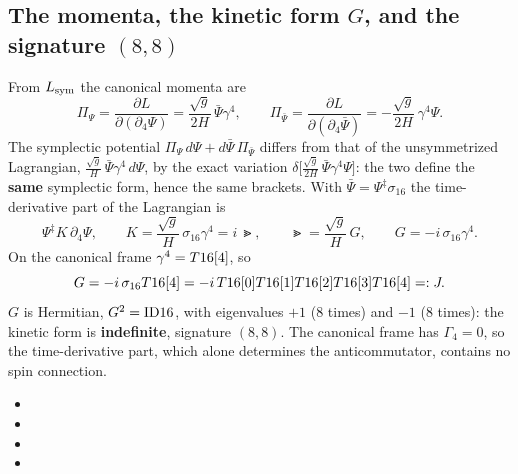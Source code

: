 \subsection{The momenta, the kinetic form \texorpdfstring{$G$}{G}, and the signature \texorpdfstring{$(8,8)$}{(8,8)}}
\label{sec:6.2}

From $L_{\mathrm{sym}}$ the canonical momenta are
\[
  \Pi_\Psi=\frac{\partial L}{\partial(\partial_4\Psi)}=\frac{\sqrt g}{2H}\,\bar\Psi\gamma^4,\qquad
  \Pi_{\bar\Psi}=\frac{\partial L}{\partial(\partial_4\bar\Psi)}=-\frac{\sqrt g}{2H}\,\gamma^4\Psi .
\]
The symplectic potential $\Pi_\Psi\,d\Psi+d\bar\Psi\,\Pi_{\bar\Psi}$ differs from that of the
unsymmetrized Lagrangian, $\frac{\sqrt g}{H}\,\bar\Psi\gamma^4\,d\Psi$, by the exact variation
$\delta\bigl[\frac{\sqrt g}{2H}\,\bar\Psi\gamma^4\Psi\bigr]$: the two define the \textbf{same}
symplectic form, hence the same brackets. With $\bar\Psi=\Psi^{\ddagger}\sigma_{16}$ the
time-derivative part of the Lagrangian is
\[
  \Psi^{\ddagger}K\,\partial_4\Psi,\qquad K=\frac{\sqrt g}{H}\,\sigma_{16}\gamma^4=i\,\Gt,\qquad
  \Gt=\frac{\sqrt g}{H}\,G,\qquad G=-i\,\sigma_{16}\gamma^4 .
\]
On the canonical frame $\gamma^4=T16[4]$, so
\[
  G=-i\,\sigma_{16}T16[4]=-i\,T16[0]T16[1]T16[2]T16[3]T16[4]=:J .
\]
$G$ is Hermitian, $G^2=\mathrm{ID16}$, with eigenvalues $+1$ (8 times) and $-1$ (8 times): the kinetic form is
\textbf{indefinite}, signature $(8,8)$. The canonical frame has $\Gamma_4=0$, so the time-derivative
part, which alone determines the anticommutator, contains no spin connection. 
\begin{itemize}
  \item {}
  \item {}
  \item {}
  \item {}
\end{itemize}

